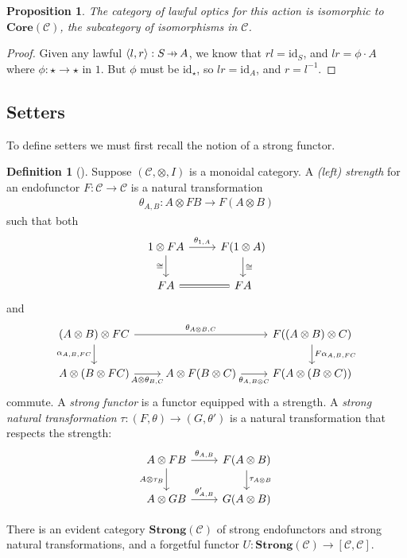 \documentclass[11pt,a4paper]{article}
\theoremstyle{plain}
\newtheorem{proposition}[theorem]{Proposition}
\theoremstyle{definition}
\newtheorem{definition}[theorem]{Definition}
\newcommand{\C}{\mathscr{C}}
\newcommand{\Core}{\mathbf{Core}}
\newcommand{\Strong}{\mathbf{Strong}}
\newcommand{\id}{\mathrm{id}}
\newcommand{\hto}{\ensuremath{\,\mathaccent\shortmid\rightarrow\,}}
\newcommand{\todo}[1]{\textcolor{red}{\small #1}}
\begin{document}
\begin{proposition}
The category of \emph{lawful} optics for this action is isomorphic to $\Core(\C)$, the subcategory of isomorphisms in $\C$.
\end{proposition}
\begin{proof}
Given any lawful $\langle l, r \rangle : S \hto A$, we know that $rl = \id_S$, and $lr = \phi \cdot A$ where $\phi : \star \to \star$ in $1$. But $\phi$ must be $\id_\star$, so $lr = \id_A$, and $r = l^{-1}$.
\end{proof}

\subsection{Setters}

To define setters we must first recall the notion of a strong functor.

\begin{definition}[\cite{StrongFunctors}]
Suppose $(\C, \otimes, I)$ is a monoidal category. A \emph{(left) strength} for an endofunctor $F : \C \to \C$ is a natural transformation
\begin{align*}
\theta_{A,B} : A \otimes F B \to F(A \otimes B)
\end{align*}
such that both
\[
\begin{tikzcd}
1 \otimes F A \ar[r, "\theta_{1,A}"] \ar[d, "\cong" left]  & F(1 \otimes A) \ar[d, "\cong" right] \\
F A \ar[r, equals] & F A
\end{tikzcd}
\]
and
\[
\begin{tikzcd}
(A \otimes B) \otimes F C \ar[rr, "\theta_{A \otimes B, C}"] \ar[d, "\alpha_{A,B,FC}" left]  && F((A \otimes B) \otimes C) \ar[d, "F\alpha_{A,B,FC}" right] \\
A \otimes (B \otimes F C) \ar[r, "A \otimes \theta_{B,C}" below] & A \otimes F(B \otimes C) \ar[r, "\theta_{A, B\otimes C}" below] & F(A \otimes (B \otimes C))
\end{tikzcd}
\]
commute. A \emph{strong functor} is a functor equipped with a strength. A \emph{strong natural transformation} $\tau : (F,\theta) \to (G,\theta')$ is a natural transformation that respects the strength:
\[
\begin{tikzcd}
A \otimes F B \ar[r, "\theta_{A,B}"] \ar[d, "A \otimes \tau_B" left]  & F(A \otimes B) \ar[d, "\tau_{A \otimes B}" right] \\
A \otimes G B \ar[r, "\theta'_{A, B}"]& G(A \otimes B)
\end{tikzcd}
\]

There is an evident category $\Strong(\C)$ of strong endofunctors and strong natural transformations, and a forgetful functor $U : \Strong(\C) \to [\C, \C]$.
\end{definition}
\end{document}
